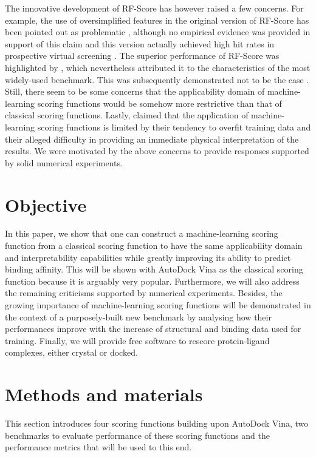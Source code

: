 The innovative development of RF-Score has however raised a few concerns. For example, the use of oversimplified features in the original version of RF-Score has been pointed out as problematic \citep{1453}, although no empirical evidence was provided in support of this claim and this version actually achieved high hit rates in prospective virtual screening \citep{1281}. The superior performance of RF-Score was highlighted by \citep{774}, which nevertheless attributed it to the characteristics of the most widely-used benchmark. This was subsequently demonstrated not to be the case \citep{908}. Still, there seem to be some concerns that the applicability domain of machine-learning scoring functions would be somehow more restrictive than that of classical scoring functions. Lastly, \citep{1372} claimed that the application of machine-learning scoring functions is limited by their tendency to overfit training data and their alleged difficulty in providing an immediate physical interpretation of the results. We were motivated by the above concerns to provide responses supported by solid numerical experiments.

\section{Objective}

In this paper, we show that one can construct a machine-learning scoring function from a classical scoring function to have the same applicability domain and interpretability capabilities while greatly improving its ability to predict binding affinity. This will be shown with AutoDock Vina \citep{595} as the classical scoring function because it is arguably very popular. Furthermore, we will also address the remaining criticisms supported by numerical experiments. Besides, the growing importance of machine-learning scoring functions will be demonstrated in the context of a purposely-built new benchmark by analysing how their performances improve with the increase of structural and binding data used for training. Finally, we will provide free software to rescore protein-ligand complexes, either crystal or docked.

\section{Methods and materials}

This section introduces four scoring functions building upon AutoDock Vina, two benchmarks to evaluate performance of these scoring functions and the performance metrics that will be used to this end.

